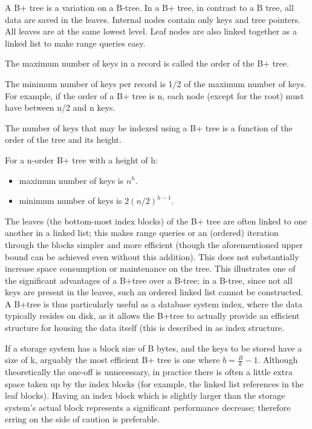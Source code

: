 \documentclass[11pt, a4paper]{article}
\begin{document}
\noindent A B+ tree is a variation on a B-tree. In a B+ tree, in contrast to a B tree, all data are saved in the leaves. Internal nodes contain only keys and tree pointers. All leaves are at the same lowest level. Leaf nodes are also linked together as a linked list to make range queries easy. \vspace{0.5cm}

\noindent The maximum number of keys in a record is called the order of the B+ tree. \vspace{0.5cm}

\noindent The minimum number of keys per record is 1/2 of the maximum number of keys. For example, if the order of a B+ tree is n, each node (except for the root) must have between n/2 and n keys. \vspace{0.5cm}

\noindent The number of keys that may be indexed using a B+ tree is a function of the order of the tree and its height. \vspace{0.5cm}

\noindent For a n-order B+ tree with a height of h: 

\begin{itemize}
    \item maximum number of keys is $n^h$.
    \item minimum number of keys is  $2(n/2)^{h-1}$.
\end{itemize}

\noindent The leaves (the bottom-most index blocks) of the B+ tree are often linked to one another in a linked list; this makes range queries or an (ordered) iteration through the blocks simpler and more efficient (though the aforementioned upper bound can be achieved even without this addition). This does not substantially increase space consumption or maintenance on the tree. This illustrates one of the significant advantages of a B+tree over a B-tree; in a B-tree, since not all keys are present in the leaves, such an ordered linked list cannot be constructed. A B+tree is thus particularly useful as a database system index, where the data typically resides on disk, as it allows the B+tree to actually provide an efficient structure for housing the data itself (this is described in as index structure.

\noindent If a storage system has a block size of B bytes, and the keys to be stored have a size of k, arguably the most efficient B+ tree is one where $b=\frac{B}{k}-1$. Although theoretically the one-off is unnecessary, in practice there is often a little extra space taken up by the index blocks (for example, the linked list references in the leaf blocks). Having an index block which is slightly larger than the storage system's actual block represents a significant performance decrease; therefore erring on the side of caution is preferable.
\end{document}
